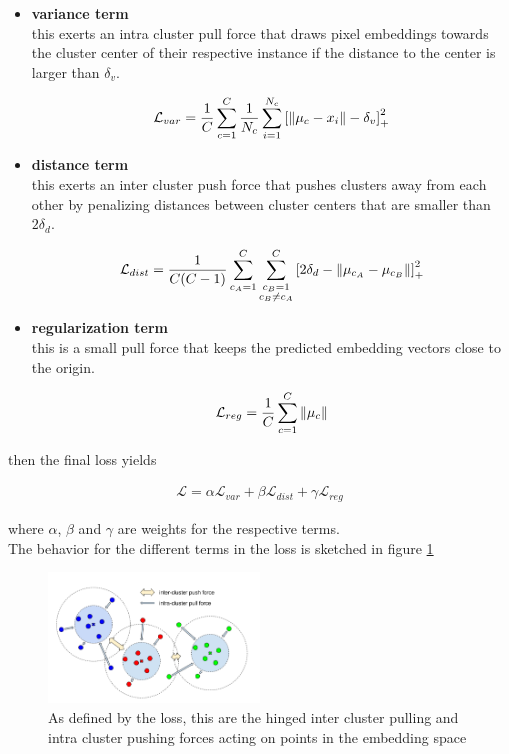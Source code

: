 \begin{itemize}
	\item \textbf{variance term}\\
	this exerts an intra cluster pull force that draws pixel embeddings towards the cluster center of their respective instance if the distance to the center is larger than $\delta_v$.
	
	\begin{align}
		\mathcal{L}_{var} = \frac{1}{C} \sum_{c=1}^C \frac{1}{N_c} \sum_{i=1}^{N_c} \left[ \left\lVert\mu_c - x_i\right\rVert - \delta_v \right]_+^2
	\end{align}
	
	\item \textbf{distance term}\\
	this exerts an inter cluster push force that pushes clusters away from each other by penalizing distances between cluster centers that are smaller than $2\delta_d$.
	
	\begin{align}
		\mathcal{L}_{dist} = \frac{1}{C(C-1)} \sum_{c_A=1}^C \sum_{\substack{c_B=1 \\ c_B \neq c_A}}^C \left[ 2\delta_d - \left\lVert\mu_{c_A} - \mu_{c_B}\right\rVert \right]_+^2
	\end{align}
	
	\item \textbf{regularization term}\\
	this is a small pull force that keeps the predicted embedding vectors close to the origin.
	
	\begin{align}
		\mathcal{L}_{reg} = \frac{1}{C} \sum_{c=1}^C \left\lVert\mu_c\right\rVert
 	\end{align}
\end{itemize}

then the final loss yields

\begin{align}
	\mathcal{L} = \alpha \mathcal{L}_{var} + \beta \mathcal{L}_{dist} + \gamma \mathcal{L}_{reg}
\end{align}

where $\alpha$, $\beta$ and $\gamma$ are weights for the respective terms.\\

The behavior for the different terms in the loss is sketched in figure \ref{fig_contrastive}

\begin{figure}[ht]
	\centering
	\includegraphics[width=0.5\textwidth]{figures/contrastive_loss.png}
	\caption{\cite{brab2017semantic} As defined by the loss, this are the hinged inter cluster pulling and intra cluster pushing forces acting on points in the embedding space}
	\label{fig_contrastive}
\end{figure}

